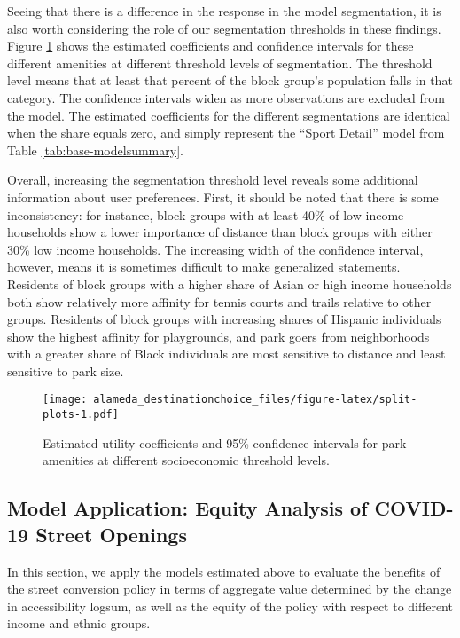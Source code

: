 \documentclass[3p, authoryear, review]{elsarticle} %
\makeatletter
\def\maxwidth{\ifdim\Gin@nat@width>\linewidth\linewidth
\else\Gin@nat@width\fi}
\let\Oldincludegraphics\includegraphics
\renewcommand{\includegraphics}[1]{\Oldincludegraphics[width=\maxwidth]{#1}}
\makeatother
\begin{document}
Seeing that there is a difference in the response in the model segmentation,
it is also worth considering the role of our segmentation thresholds in these
findings. Figure \ref{fig:split-plots} shows the estimated coefficients and
confidence intervals for these different amenities at different threshold levels
of segmentation. The threshold level means that at least that percent
of the block group's population falls in that category. The confidence intervals
widen as more observations are excluded from the model. The estimated coefficients
for the different segmentations are identical when the share equals zero, and
simply represent the ``Sport Detail'' model from Table \ref{tab:base-modelsummary}.

Overall, increasing the segmentation threshold level reveals some additional
information about user preferences. First, it should be noted that there is
some inconsistency: for instance, block groups with at least 40\% of low income
households show a lower importance of distance than block groups with either
30\% low income households. The increasing width of the confidence interval,
however, means it is sometimes difficult to make generalized statements. Residents of
block groups with a higher share of Asian or high income households both show
relatively more affinity for tennis courts and trails relative to other groups.
Residents of block groups with increasing shares of Hispanic individuals show
the highest affinity for playgrounds, and park goers from neighborhoods with a
greater share of Black individuals are most sensitive to distance and least
sensitive to park size.

\begin{figure}
\centering
\texttt{[image: alameda\_destinationchoice\_files/figure-latex/split-plots-1.pdf]}
\caption{\label{fig:split-plots}Estimated utility coefficients and 95\% confidence intervals for park amenities at different socioeconomic threshold levels.}
\end{figure}

\hypertarget{model-application-equity-analysis-of-covid-19-street-openings}{%
\subsection{Model Application: Equity Analysis of COVID-19 Street Openings}\label{model-application-equity-analysis-of-covid-19-street-openings}}

In this section, we apply the models estimated above to evaluate the benefits of
the street conversion policy in terms of aggregate value determined by the change
in accessibility logsum, as well as the equity of the policy with respect to
different income and ethnic groups.
\end{document}
